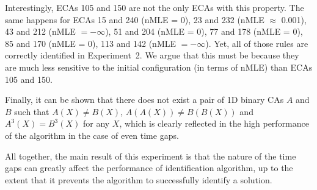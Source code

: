 Interestingly, ECAs 105 and 150 are not the only ECAs with this property. The same happens for ECAs 15 and 240 (nMLE = 0), 23 and 232 (nMLE $\approx$ 0.001), 43 and 212 (nMLE $= -\infty$), 51 and 204 (nMLE = 0), 77 and 178 (nMLE = 0), 85 and 170 (nMLE = 0), 113 and 142 (nMLE $=-\infty$). Yet, all of those rules are correctly identified in Experiment~2. We argue that this must be because they are much less sensitive to the initial configuration (in terms of nMLE) than ECAs 105 and 150.

Finally, it can be shown that there does not exist a pair of 1D binary CAs $A$ and $B$ such that $A(X)\neq B(X)$, $A(A(X)) \neq B(B(X))$ and $A^3(X) = B^3(X)$ for any $X$, which is clearly reflected in the high performance of the algorithm in the case of even time gaps.

All together, the main result of this experiment is that the nature of the time gaps can greatly affect the performance of identification algorithm, up to the extent that it prevents the algorithm to successfully identify a solution.
\begin{table}[ht]
	\centering
	\caption{Experiment 3: The performance of the GA expressed in terms of the average of the minimum, average and maximum number of iterations per behavioral class according to Wolfram's classification scheme \protect{} and the nMLE~\protect{} in the case of constant, even time gaps (case 1).}\label{tab:exp3a}
	\quad
\end{table}

